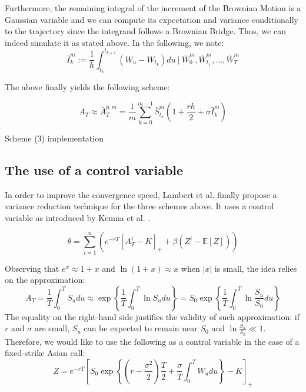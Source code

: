 \documentclass{article}
\begin{document}
Furthermore, the remaining integral of the increment of the Brownian Motion is a Gaussian variable and we can
compute its expectation and variance conditionally to the trajectory since the integrand follows a Brownian Bridge.
Thus, we can indeed simulate it as stated above. In the following, we note:
\[
	\bar I_k^m := \frac{1}{h}
	\int_{t_k}^{t_{k+1}} \left( W_u - W_{t_k} \right) du \ \Big\vert \ \bar W_0^m, \bar W_{t_1}^m, \dots, \bar W_T^m
\]

The above finally yields the following scheme:

\begin{equation}
    A_T \approx \bar A_T^{p, m} = \frac{1}{m} \sum_{k=0}^{m-1}
    	\bar S_{t_k}^m \left( 1 + \frac{rh}{2} + \sigma \bar I_k^m \right) \tag{3}
\end{equation}

\begin{algorithm}[hbt!]
\caption{Scheme (3) implementation}
\Return{$\dots$}\;
\end{algorithm}

\subsection{The use of a control variable}

In order to improve the convergence speed, Lambert et al. \cite{main} finally propose a variance reduction technique
for the three schemes above. It uses a control variable as introduced by Kemna et al. \cite{Vorst}.

\begin{equation}
	\theta = \sum_{i=1}^n \left( e^{-rT} \left[ A_T^i - K \right]_+ + \beta \left( Z^i - \mathbb E [Z] \right) \right)
	\tag{$\ast$}
\end{equation}

Observing that $e^x \approx 1 + x$ and $\ln(1 + x) \approx x$ when $| x |$ is small,
the idea relies on the approximation:
\[
	A_T = \frac{1}{T} \int_0^T S_u du \approx \exp \left\{ \frac{1}{T} \int_0^T \ln S_u du \right\}
	= S_0 \exp \left\{ \frac{1}{T} \int_0^T \ln \frac{S_u}{S_0} du \right\}
\]
The equality on the right-hand side justifies the validity of such approximation: if $r$ and $\sigma$ are small,
$S_u$ can be expected to remain near $S_0$ and $\ln \frac{S_u}{S_0} \ll 1$.
Therefore, we would like to use the following as a control variable in the case of a fixed-strike Asian call:
\[
	Z
	= e^{-rT} \left[ S_0 \exp \left\{ \left( r - \frac{\sigma^2}{2} \right) \frac{T}{2} +
		\frac{\sigma}{T} \int_0^T W_u du \right\}
		- K \right]_+
\]
\end{document}
